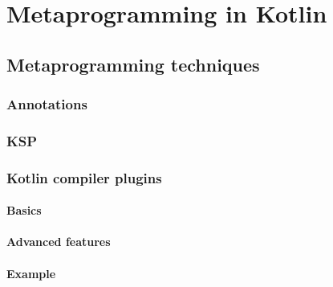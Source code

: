 \chapter{Metaprogramming in Kotlin}\label{metaprogramming}

\section{Metaprogramming techniques}
\subsection{Annotations}
\subsection{KSP}
\subsection{Kotlin compiler plugins}
\subsubsection{Basics}
\subsubsection{Advanced features}
\subsubsection{Example}
